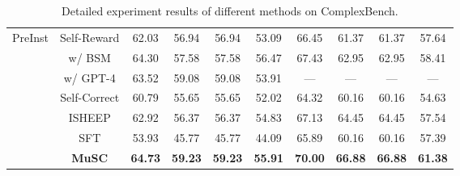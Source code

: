 \begin{table*}[ht]
{\begin{tabular}{cc|cccc|cccc}
\multirow{7}{*}{PreInst}           & Self-Reward                      & 62.03            & 56.94          & 56.94          & 53.09              & 66.45            & 61.37          & 61.37          & 57.64              \\
                                   & w/ BSM                           & 64.30            & 57.58          & 57.58          & 56.47              & 67.43            & 62.95          & 62.95          & 58.41              \\
                                   & w/ GPT-4                         & 63.52            & 59.08          & 59.08          & 53.91              & —                & —              & —              & —                  \\ \cline{2-10} 
                                   & Self-Correct                     & 60.79            & 55.65          & 55.65          & 52.02              & 64.32            & 60.16          & 60.16          & 54.63              \\
                                   & ISHEEP                           & 62.92            & 56.37          & 56.37          & 54.83              & 67.13            & 64.45          & 64.45          & 57.54              \\
                                   & SFT                              & 53.93            & 45.77          & 45.77          & 44.09              & 65.89            & 60.16          & 60.16          & 57.39              \\ \cline{2-10} 
                                   & \textbf{MuSC}                    & \textbf{64.73}   & \textbf{59.23} & \textbf{59.23} & \textbf{55.91}     & \textbf{70.00}   & \textbf{66.88} & \textbf{66.88} & \textbf{61.38}     \\ \hline
\end{tabular}}
\label{tab:complexbench}
\caption{Detailed experiment results of different methods on ComplexBench.}
\label{tab:complexbench}
\end{table*}

